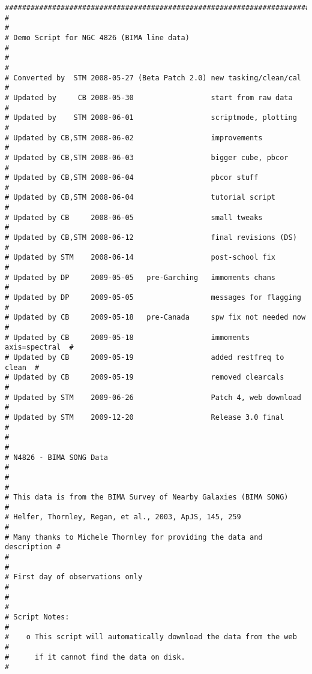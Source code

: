 \small
\begin{verbatim}
##########################################################################
#                                                                        #
# Demo Script for NGC 4826 (BIMA line data)                              #
#                                                                        #
# Converted by  STM 2008-05-27 (Beta Patch 2.0) new tasking/clean/cal    #
# Updated by     CB 2008-05-30                  start from raw data      #
# Updated by    STM 2008-06-01                  scriptmode, plotting     #
# Updated by CB,STM 2008-06-02                  improvements             #
# Updated by CB,STM 2008-06-03                  bigger cube, pbcor       #
# Updated by CB,STM 2008-06-04                  pbcor stuff              #
# Updated by CB,STM 2008-06-04                  tutorial script          #
# Updated by CB     2008-06-05                  small tweaks             #
# Updated by CB,STM 2008-06-12                  final revisions (DS)     #
# Updated by STM    2008-06-14                  post-school fix          #
# Updated by DP     2009-05-05   pre-Garching   immoments chans          #
# Updated by DP     2009-05-05                  messages for flagging    #
# Updated by CB     2009-05-18   pre-Canada     spw fix not needed now   #
# Updated by CB     2009-05-18                  immoments axis=spectral  #
# Updated by CB     2009-05-19                  added restfreq to clean  #
# Updated by CB     2009-05-19                  removed clearcals        #
# Updated by STM    2009-06-26                  Patch 4, web download    #
# Updated by STM    2009-12-20                  Release 3.0 final        #
#                                                                        #
# N4826 - BIMA SONG Data                                                 #
#                                                                        #
# This data is from the BIMA Survey of Nearby Galaxies (BIMA SONG)       #
# Helfer, Thornley, Regan, et al., 2003, ApJS, 145, 259                  #
# Many thanks to Michele Thornley for providing the data and description #
#                                                                        #
# First day of observations only                                         #
#                                                                        #
# Script Notes:                                                          #
#    o This script will automatically download the data from the web     #
#      if it cannot find the data on disk.                               #

\end{verbatim}

